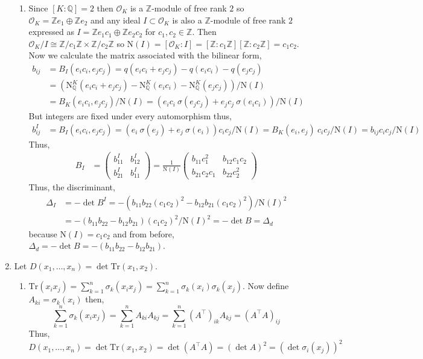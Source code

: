 \documentclass[12pt]{extarticle}
\newcommand{\Z}{\mathbb{Z}}
\newcommand{\Q}{\mathbb{Q}}
\newcommand{\ints}[1]{\mathcal{O}_{#1}}
\newcommand{\qnorm}[2]{\mathrm{N}^{#1}_{\Q}\left(#2\right)}
\newcommand{\inorm}[1]{\mathrm{N}(#1)}
\newcommand{\tr}[1]{\mathrm{Tr} \! \left(#1\right)}
\begin{document}
\begin{enumerate}
\begin{enumerate}
\item Since $[K : \Q] = 2$ then $\ints{K}$ is a $\Z$-module of free rank $2$ so $\ints{K} = \Z e_1 \oplus \Z e_2$ and any ideal $I \subset \ints{K}$ is also a $\Z$-module of free rank $2$ expressed as $I = \Z e_1 c_1 \oplus \Z e_2 c_2$ for $c_1, c_2 \in \Z$. Then $\ints{K}/I \cong \Z/c_1 \Z \times \Z / c_2 \Z$ so $\inorm{I} = [\ints{K} : I] = [\Z : c_1 \Z] [\Z : c_2 \Z] = c_1 c_2$. Now we calculate the matrix associated with the bilinear form,
\begin{align*}
b_{ij} &= B_I(e_i c_i, e_j c_j) = q(e_i c_i + e_j c_j) - q(e_i c_i) - q(e_j c_j) \\ &= (\qnorm{K}{e_i c_i + e_j c_j} - \qnorm{K}{e_i c_i} - \qnorm{K}{e_j c_j})/\inorm{I}  \\
&= B_K(e_i c_i, e_j c_j)/\inorm{I} = (e_i c_i \: \sigma(e_j c_j) + e_j c_j \: \sigma(e_i c_i))/ \inorm{I} 
\end{align*}
But integers are fixed under every automorphism thus,
\begin{align*}
b_{ij}^I &= B_I(e_i c_i, e_j c_j) = (e_i \:\sigma(e_j) + e_j\: \sigma(e_i)) c_i c_j/ \inorm{I}  = B_K(e_i, e_j) \: c_i c_j /\inorm{I} = b_{ij} c_i c_j /\inorm{I}
\end{align*}
Thus, \begin{align*} B_I &= 
\begin{pmatrix}
b_{11}^I & b_{12}^I \\
b_{21}^I & b_{11}^I			
\end{pmatrix} = \frac{1}{\inorm{I}}
\begin{pmatrix}
b_{11} c_1^2 & b_{12} c_1 c_2 \\
b_{21} c_2 c_1 & b_{22} c_2^2		
\end{pmatrix} 
\end{align*}
Thus, the discriminant, 
\begin{align*}
\Delta_I &= - \det{B^I} = - (b_{11} b_{22} (c_1 c_2)^2 - b_{12} b_{21} (c_1 c_2)^2)/ \inorm{I}^2 \\ &= -(b_{11} b_{22} - b_{12} b_{21}) (c_1 c_2)^2 / \inorm{I}^2 = - \det{B} = \Delta_d
\end{align*}
because $\inorm{I} = c_1 c_2$ and from before, $\Delta_d = -\det{B} = -(b_{11} b_{22} - b_{12} b_{21})$.

\end{enumerate}

\item Let $D(x_1, \dots, x_n) = \det{\tr{x_1, x_2}}$.

\begin{enumerate}
\item $\tr{x_i x_j} = \sum\limits_{k = 1}^n \sigma_k (x_i x_j) = \sum\limits_{k = 1}^n \sigma_k (x_i) \sigma_k(x_j)$. Now define $A_{ki} = \sigma_k(x_i)$ then, \[\sum\limits_{k = 1}^n \sigma_k (x_i x_j) = \sum\limits_{k = 1}^n A_{ki} A_{kj} = \sum\limits_{k = 1}^n (A^\top)_{ik} A_{kj} = (A^\top A)_{ij}\] Thus, \[D(x_1, \dots, x_n) = \det{\tr{x_1, x_2}} = \det{(A^\top A)} = (\det{A})^2 = (\det{\sigma_i(x_j)})^2\]


\end{enumerate}
\end{enumerate}
\end{document}
